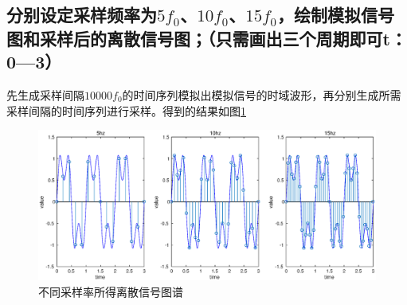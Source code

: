 \documentclass[UTF8]{article}
\begin{document}
\begin{CJK}{UTF8}{gkai}
\subsection{分别设定采样频率为$5f_0$、$10f_0$、$15f_0$，绘制模拟信号图和采样后的离散信号图；（只需画出三个周期即可t：0—3）}
先生成采样间隔$10000f_0$的时间序列模拟出模拟信号的时域波形，再分别生成所需采样间隔的时间序列进行采样。得到的结果如图\ref{pro2_fig1}
\begin{figure}
  \centering
  \includegraphics[scale=0.4]{pro2_subpro1.eps}
  \caption{不同采样率所得离散信号图谱}
  \label{pro2_fig1}
\end{figure}

\end{CJK}
\end{document}
